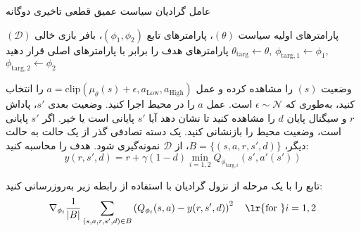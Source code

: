   \begin{algorithm}[H]
  	\caption{عامل گرادیان سیاست عمیق قطعی تاخیری دوگانه}\label{alg:TD3}
  	\begin{algorithmic}[1]
  		 پارامترهای اولیه سیاست
  		$(\theta)$، پارامترهای تابع
  		$(\phi_1, \phi_2)$،
  		 بافر بازی خالی $(\mathcal{D})$
  		\State پارامترهای هدف را برابر با پارامترهای اصلی قرار دهید
  		$\theta_{\text{targ}} \leftarrow \theta$,
  		 $\phi_{\text{targ}, 1} \leftarrow \phi_1$,
  		  $\phi_{\text{targ}, 2} \leftarrow \phi_2$
  		
  		\State 
  		وضعیت $(s)$ را مشاهده کرده و عمل 
  		$a = \text{clip}(\mu_{\theta}(s) + \epsilon, a_{\text{Low}}, a_{\text{High}})$
  		 را انتخاب کنید، به‌طوری که $\epsilon \sim \mathcal{N}$ است.
  		\State عمل $a$ را در محیط اجرا کنید.
  		\State 
  		وضعیت بعدی $s'$، پاداش $r$ و سیگنال پایان $d$ را مشاهده کنید تا نشان دهد آیا $s'$ پایانی است یا خیر.
  		\State اگر $s'$ پایانی است، وضعیت محیط را بازنشانی کنید.
  		\State یک دسته تصادفی گذر از ‌یک حالت به حالت دیگر، $B = \{ (s,a,r,s',d) \}$، از $\mathcal{D}$ نمونه‌گیری شود.
%  			
  		\State
  		هدف را محاسبه کنید:
  		\begin{equation*}
  			 y(r,s',d) = r + \gamma (1-d) \min_{i=1,2} Q_{\phi_{\text{targ},i}}(s', a'(s')) 
  		\end{equation*}
  		
  		\State تابع  را با یک مرحله از نزول گرادیان با استفاده از رابطه زیر به‌روزرسانی کنید:
  		\begin{align*} 
  			 \nabla_{\phi_i} \frac{1}{|B|}\sum_{(s,a,r,s',d) \in B} \left( Q_{\phi_i}(s,a) - y(r,s',d) \right)^2 
  			 \quad \text{\lr{for }}i=1,2 
  		\end{align*}
  		

\end{algorithmic}
\end{algorithm}
